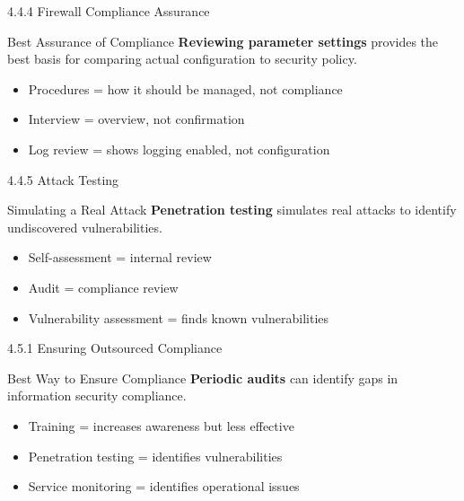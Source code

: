 \documentclass{beamer}
\begin{document}
	\begin{frame}{4.4.4 Firewall Compliance Assurance}
		\begin{block}{Best Assurance of Compliance}
			\textbf{Reviewing parameter settings} provides the best basis for comparing actual configuration to security policy.
		\end{block}
		\begin{itemize}
			\item Procedures = how it should be managed, not compliance
			\item Interview = overview, not confirmation
			\item Log review = shows logging enabled, not configuration
		\end{itemize}
	\end{frame}
	
	\begin{frame}{4.4.5 Attack Testing}
		\begin{block}{Simulating a Real Attack}
			\textbf{Penetration testing} simulates real attacks to identify undiscovered vulnerabilities.
		\end{block}
		\begin{itemize}
			\item Self-assessment = internal review
			\item Audit = compliance review
			\item Vulnerability assessment = finds known vulnerabilities
		\end{itemize}
	\end{frame}
	
	\begin{frame}{4.5.1 Ensuring Outsourced Compliance}
		\begin{block}{Best Way to Ensure Compliance}
			\textbf{Periodic audits} can identify gaps in information security compliance.
		\end{block}
		\begin{itemize}
			\item Training = increases awareness but less effective
			\item Penetration testing = identifies vulnerabilities
			\item Service monitoring = identifies operational issues
		\end{itemize}
	\end{frame}
	
\end{document}
